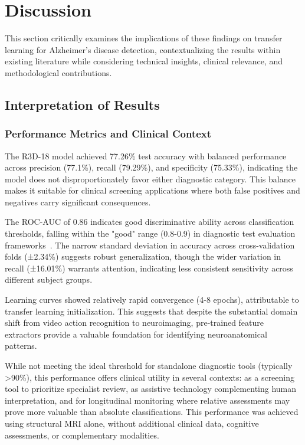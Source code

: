 \documentclass[11pt, a4paper]{article}
\begin{document}
\section{Discussion}
\label{sec:discussion}

This section critically examines the implications of these findings on transfer learning for Alzheimer's disease detection, contextualizing the results within existing literature while considering technical insights, clinical relevance, and methodological contributions.

\subsection{Interpretation of Results}

\subsubsection{Performance Metrics and Clinical Context}

The R3D-18 model achieved 77.26\% test accuracy with balanced performance across precision (77.1\%), recall (79.29\%), and specificity (75.33\%), indicating the model does not disproportionately favor either diagnostic category. This balance makes it suitable for clinical screening applications where both false positives and negatives carry significant consequences.

The ROC-AUC of 0.86 indicates good discriminative ability across classification thresholds, falling within the "good" range (0.8-0.9) in diagnostic test evaluation frameworks~\cite{mandrekar2010receiver}. The narrow standard deviation in accuracy across cross-validation folds (±2.34\%) suggests robust generalization, though the wider variation in recall (±16.01\%) warrants attention, indicating less consistent sensitivity across different subject groups.

Learning curves showed relatively rapid convergence (4-8 epochs), attributable to transfer learning initialization. This suggests that despite the substantial domain shift from video action recognition to neuroimaging, pre-trained feature extractors provide a valuable foundation for identifying neuroanatomical patterns.

While not meeting the ideal threshold for standalone diagnostic tools (typically >90\%), this performance offers clinical utility in several contexts: as a screening tool to prioritize specialist review, as assistive technology complementing human interpretation, and for longitudinal monitoring where relative assessments may prove more valuable than absolute classifications. This performance was achieved using structural MRI alone, without additional clinical data, cognitive assessments, or complementary modalities.
\end{document}
